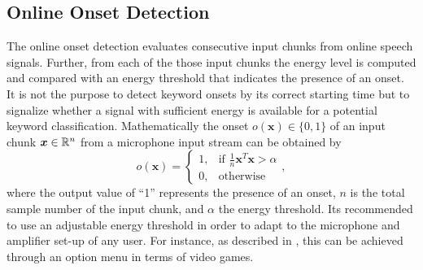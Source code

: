 
\subsection{Online Onset Detection}\label{sec:signal_onset_online}
The online onset detection evaluates consecutive input chunks from online speech signals.
Further, from each of the those input chunks the energy level is computed and compared with an energy threshold that indicates the presence of an onset.
It is not the purpose to detect keyword onsets by its correct starting time but to signalize whether a signal with sufficient energy is available for a potential keyword classification.
Mathematically the onset $o(\bm{x}) \in \{0, 1\}$ of an input chunk $\bm{x} \in \mathbb{R}^n$ from a microphone input stream can be obtained by
\begin{equation}
  o(\bm{x}) = 
  \begin{cases}
    1, & \text{if } \frac{1}{n} \bm{x}^T \bm{x} > \alpha\\
    0, & \text{otherwise} 
  \end{cases},
\end{equation}
where the output value of \enquote{1} represents the presence of an onset, $n$ is the total sample number of the input chunk, and $\alpha$ the energy threshold.
Its recommended to use an adjustable energy threshold in order to adapt to the microphone and amplifier set-up of any user.
For instance, as described in , this can be achieved through an option menu in terms of video games.